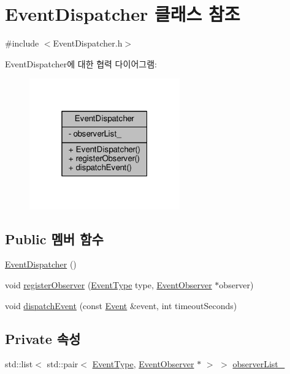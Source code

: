 \hypertarget{class_event_dispatcher}{}\section{Event\+Dispatcher 클래스 참조}
\label{class_event_dispatcher}


{\ttfamily \#include $<$Event\+Dispatcher.\+h$>$}



Event\+Dispatcher에 대한 협력 다이어그램\+:
\nopagebreak
\begin{figure}[H]
\begin{center}
\leavevmode
\includegraphics[width=184pt]{class_event_dispatcher__coll__graph}
\end{center}
\end{figure}
\subsection*{Public 멤버 함수}
\begin{DoxyCompactItemize}
\item 
\hyperlink{class_event_dispatcher_ac34b07e6e793f0468642614b608c82df}{Event\+Dispatcher} ()
\item 
void \hyperlink{class_event_dispatcher_a2b4eb5b4034b272ac58f19c862ac9ea0}{register\+Observer} (\hyperlink{_event_dispatcher_8h_a2628ea8d12e8b2563c32f05dc7fff6fa}{Event\+Type} type, \hyperlink{class_event_observer}{Event\+Observer} $\ast$observer)
\item 
void \hyperlink{class_event_dispatcher_a2ed4fad1e5c05ae4a837baacdc42e737}{dispatch\+Event} (const \hyperlink{class_event}{Event} \&event, int timeout\+Seconds)
\end{DoxyCompactItemize}
\subsection*{Private 속성}
\begin{DoxyCompactItemize}
\item 
std\+::list$<$ std\+::pair$<$ \hyperlink{_event_dispatcher_8h_a2628ea8d12e8b2563c32f05dc7fff6fa}{Event\+Type}, \hyperlink{class_event_observer}{Event\+Observer} $\ast$ $>$ $>$ \hyperlink{class_event_dispatcher_af24674678ad75412a8700583deef8f8d}{observer\+List\+\_\+}
\end{DoxyCompactItemize}


